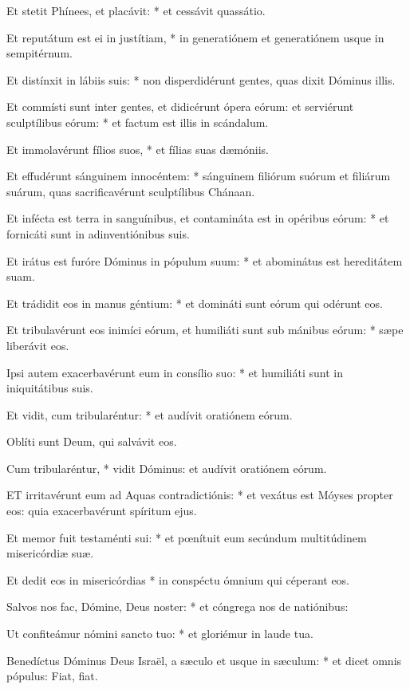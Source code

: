 Et stetit Phínees, et placávit: * et cessávit quassátio.

Et reputátum est ei in justítiam, * in generatiónem et generatiónem usque in sempitérnum.

Et distínxit in lábiis suis: * non disperdidérunt gentes, quas dixit Dóminus illis.

Et commísti sunt inter gentes, et didicérunt ópera eórum: et serviérunt sculptílibus eórum: * et factum est illis in scándalum.

Et immolavérunt fílios suos, * et fílias suas dæmóniis.

Et effudérunt sánguinem innocéntem: * sánguinem filiórum suórum et filiárum suárum, quas sacrificavérunt sculptílibus Chánaan.

Et infécta est terra in sanguínibus, et contamináta est in opéribus eórum: * et fornicáti sunt in adinventiónibus suis.

Et irátus est furóre Dóminus in pópulum suum: * et abominátus est hereditátem suam.

Et trádidit eos in manus géntium: * et domináti sunt eórum qui odérunt eos.

Et tribulavérunt eos inimíci eórum, et humiliáti sunt sub mánibus eórum: * sæpe liberávit eos.

Ipsi autem exacerbavérunt eum in consílio suo: * et humiliáti sunt in iniquitátibus suis.

Et vidit, cum tribularéntur: * et audívit oratiónem eórum.

 Oblíti sunt Deum, qui salvávit eos.

 Cum tribularéntur, * vidit Dóminus: et audívit oratiónem eórum.


\lettrine[lines=2]{E}{T} irritavérunt eum ad Aquas contradictiónis: * et vexátus est Móyses propter eos: quia exacerbavérunt spíritum ejus.

Et memor fuit testaménti sui: * et pœnítuit eum secúndum multitúdinem misericórdiæ suæ.

Et dedit eos in misericórdias * in conspéctu ómnium qui céperant eos.

Salvos nos fac, Dómine, Deus noster: * et cóngrega nos de natiónibus:

Ut confiteámur nómini sancto tuo: * et gloriémur in laude tua.

Benedíctus Dóminus Deus Israël, a sæculo et usque in sæculum: * et dicet omnis pópulus: Fiat, fiat.

